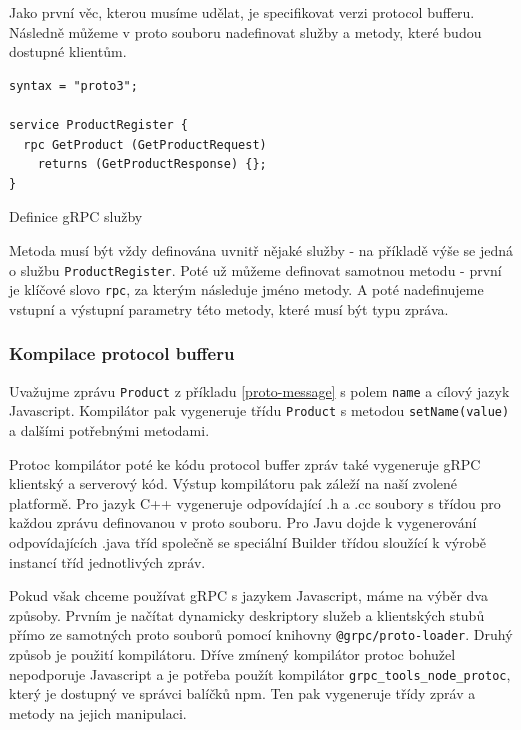 \documentclass[thesis=M,czech]{FITthesis}[2019/12/23]
\begin{document}
Jako první věc, kterou musíme udělat, je specifikovat verzi protocol bufferu. Následně můžeme v proto souboru nadefinovat služby a metody, které budou dostupné klientům.

\begin{listing}[H]
\begin{verbatim}
syntax = "proto3";

service ProductRegister {
  rpc GetProduct (GetProductRequest) 
    returns (GetProductResponse) {};
}
\end{verbatim}
\caption{Definice gRPC služby}
\label{lst:grpc_service}
\end{listing}

Metoda musí být vždy definována uvnitř nějaké služby - na příkladě  výše se jedná o službu \texttt{ProductRegister}. Poté už můžeme definovat samotnou metodu - první je klíčové slovo \texttt{rpc}, za kterým následuje jméno metody. A poté nadefinujeme vstupní a výstupní parametry této metody, které musí být typu zpráva.

\subsubsection*{Kompilace protocol bufferu}
Uvažujme zprávu \texttt{Product} z příkladu \ref{proto-message} s polem  \texttt{name} a cílový jazyk Javascript. Kompilátor pak vygeneruje třídu \texttt{Product} s metodou \texttt{setName(value)} a dalšími potřebnými metodami.

Protoc kompilátor poté ke kódu protocol buffer zpráv také vygeneruje gRPC klientský a serverový kód. Výstup kompilátoru pak záleží na naší zvolené platformě. Pro jazyk C++ vygeneruje odpovídající .h a .cc soubory s třídou pro každou zprávu definovanou v proto souboru. Pro Javu dojde k vygenerování odpovídajících .java tříd společně se speciální Builder třídou sloužící k výrobě instancí tříd jednotlivých zpráv.

Pokud však chceme používat gRPC s jazykem Javascript, máme na výběr dva způsoby. Prvním je načítat dynamicky deskriptory služeb a klientských stubů přímo ze samotných proto souborů pomocí knihovny \texttt{@grpc/proto-loader}.
Druhý způsob je použití kompilátoru. Dříve zmínený kompilátor protoc bohužel nepodporuje Javascript a je potřeba použít kompilátor \texttt{grpc_tools_node_protoc}, který je dostupný ve správci balíčků npm. Ten pak vygeneruje třídy zpráv a metody na jejich manipulaci.
\end{document}
